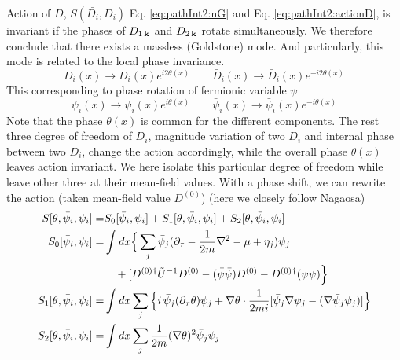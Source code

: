  Action of $D$, $S(\bar{D_i},D_i)$ Eq. \eqref{eq:pathInt2:nG} and Eq. \eqref{eq:pathInt2:actionD}, is invariant if the phases of $D_{1\,\mathbf{k}}$ and $D_{2\,\mathbf{k}}$ rotate simultaneously. We therefore conclude that there exists a massless (Goldstone) mode.  And particularly, this mode is related to the local phase invariance. 
\begin{equation*}
D_{i}(x)\rightarrow{}D_{i}(x)e^{i2\theta(x)}\qquad{}
\bar{D}_{i}(x)\rightarrow{}\bar{D}_{i}(x)e^{-i2\theta(x)}
\end{equation*}
This corresponding to  phase  rotation of fermionic variable $\psi$
\begin{equation*}
\psi_{i}(x)\rightarrow{}\psi_{i}(x)e^{i\theta(x)}\qquad{}
\bar{\psi}_{i}(x)\rightarrow{}\bar{\psi}_{i}(x)e^{-i\theta(x)}
\end{equation*}
Note that the phase $\theta(x)$ is common for the different components. The rest three degree of freedom of $D_i$, magnitude variation of two $D_i$ and internal phase between two $D_i$, change the action accordingly, while the overall phase $\theta(x)$ leaves action invariant.  We here isolate this particular degree of freedom while leave other three at their mean-field values. With a phase shift, we can rewrite the action (taken mean-field value $D^{(0)}$) (here we closely follow Nagaosa\cite{Nagaosa})
\begin{subequations}
\begin{align}\label{eq:pathInt2:actionPhase}
S[\theta,\bar\psi_{i},\psi_{i}]=&S_0[\bar\psi_{i},\psi_{i}]+S_1[\theta,\bar\psi_{i},\psi_{i}]+S_2[\theta,\bar\psi_{i},\psi_{i}]\\
S_0[\bar\psi_{i},\psi_{i}]=&\int{dx}
\Big\{\sum_{j}\bar\psi_{j}(\partial_\tau-\frac{1}{2m}\nabla^{2}-\mu+\eta_{j})\psi_{j}\nonumber\\
&\quad+[D^{(0)}{}^{\dagger}\tilde{U}^{-1}D^{(0)}-(\bar\psi\bar\psi)D^{(0)}-{D^{(0)}}{}^{\dagger}(\psi\psi)\Big\}\\
S_1[\theta,\bar\psi_{i},\psi_{i}]=&\int{dx}\sum_{j}\Big\{
   i\,\bar\psi_{j}(\partial_{\tau}\theta)\psi_{j}+\nabla\theta\cdot\frac{1}{2mi}[\bar\psi_{j}\nabla\psi_{j}-(\nabla\bar{\psi}_{j}\psi_{j})]\Big\}\\
S_2[\theta,\bar\psi_{i},\psi_{i}]=&\int{dx}\sum_{j}\frac{1}{2m}(\nabla\theta)^{2}\bar\psi_{j}\psi_{j}
\end{align}
\end{subequations}
